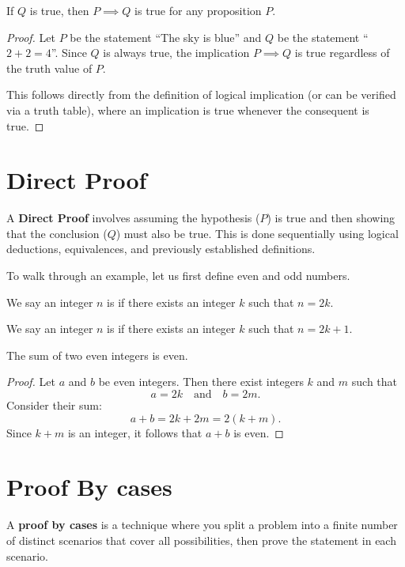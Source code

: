 \begin{theorem}
    If $Q$ is true, then $P \implies Q$ is true for any proposition $P$.
\end{theorem}

\begin{proof}
    Let $P$ be the statement ``The sky is blue'' and $Q$ be the statement ``$2 + 2 = 4$''. Since $Q$ is always true, the implication $P \implies Q$ is true regardless of the truth value of $P$.

    This follows directly from the definition of logical implication (or can be verified via a truth table), where an implication is true whenever the consequent is true.
\end{proof}

\section{Direct Proof}
A \textbf{Direct Proof} involves assuming the hypothesis ($P$) is true and then showing that the conclusion ($Q$) must also be true. This is done sequentially using logical deductions, equivalences, and previously established definitions.

To walk through an example, let us first define even and odd numbers.
\begin{mdframed}[frametitle = {Even and Odd Numbers}, style = important]
    We say an integer $n$ is  if there exists an integer $k$ such that $n = 2k$.

    We say an integer $n$ is  if there exists an integer $k$ such that $n = 2k + 1$.
\end{mdframed}
\begin{theorem}
    The sum of two even integers is even.
\end{theorem}

\begin{proof}
    Let $a$ and $b$ be even integers. Then there exist integers $k$ and $m$ such that
    \[
        a = 2k \quad \text{and} \quad b = 2m.
    \]
    Consider their sum:
    \[
        a + b = 2k + 2m = 2(k + m).
    \]
    Since $k + m$ is an integer, it follows that $a + b$ is even.
\end{proof}
\section{Proof By cases}
A \textbf{proof by cases} is a technique where you split a problem into a finite number of distinct scenarios that cover all possibilities, then prove the statement in each scenario.

